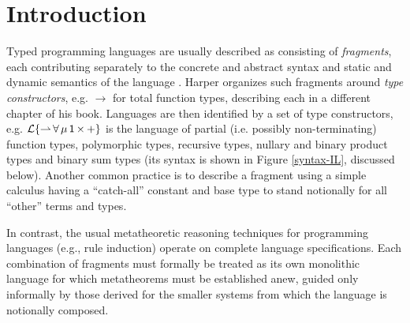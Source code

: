 \documentclass[pldi]{sigplanconf-pldi15}
\begin{document}
\section{Introduction}\label{intro}
Typed programming languages are usually described as consisting of \emph{fragments}, each contributing separately to the concrete and abstract syntax and static and dynamic semantics of the language \cite{pfpl}. 
Harper organizes such fragments around \emph{type constructors}, e.g. $\rightarrow$ for total function types, describing each in a different chapter of his book. Languages are then identified by a set of type constructors, e.g. $\mathcal{L}\{{\rightharpoonup}\,{\forall}\,{\mu}\,{{\sf 1}}\,{\times}\,{+}\}$ is the language of partial (i.e. possibly non-terminating) function types, polymorphic types, recursive types, nullary and binary product types and binary sum types (its syntax is shown in Figure \ref{syntax-IL}, discussed below).
Another common practice is to describe a fragment using a simple calculus having a ``catch-all'' constant and base type to stand notionally for all ``other'' terms and types.%

In contrast, the usual metatheoretic reasoning techniques for programming languages  (e.g., rule induction) operate on complete language specifications. Each {combination} of fragments must formally be treated as its own monolithic language for which  metatheorems must be established anew, guided only informally by those derived for the smaller systems from which the language is notionally composed.

\end{document}
